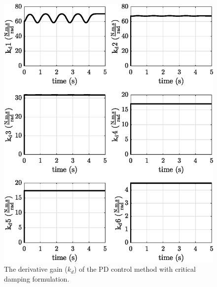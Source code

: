 \begin{figure}[H]
    \centering
    \includegraphics{images/act_1.5_sin/kd.eps}
    \caption{The derivative gain ($k_d$) of the PD control method with critical damping formulation.}
    \label{fig:act_1.5_sin_k_d}
\end{figure}